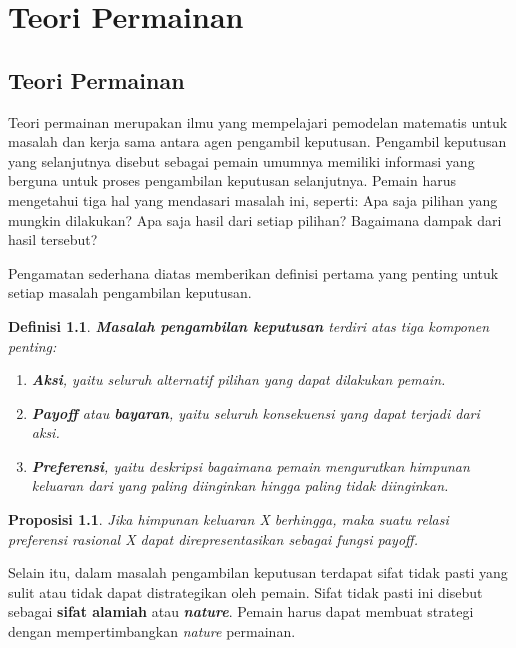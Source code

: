\newtheorem{definisi}{Definisi}
\newtheorem{proposisi}{Proposisi}
\newtheorem{aksioma}{Aksioma}
\chapter{Teori Permainan}
\section{Teori Permainan}
Teori permainan merupakan ilmu yang mempelajari pemodelan matematis untuk masalah dan kerja sama antara agen pengambil keputusan. Pengambil keputusan yang selanjutnya disebut sebagai pemain umumnya memiliki informasi yang berguna untuk proses pengambilan keputusan selanjutnya. Pemain harus mengetahui tiga hal yang mendasari masalah ini, seperti: Apa saja pilihan yang mungkin dilakukan? Apa saja hasil dari setiap pilihan? Bagaimana dampak dari hasil tersebut?

Pengamatan sederhana diatas memberikan definisi pertama yang penting untuk setiap masalah pengambilan keputusan.
\begin{definisi}
    \textbf{Masalah pengambilan keputusan} terdiri atas tiga komponen penting:
    \begin{enumerate}
        \item \textbf{Aksi}, yaitu seluruh alternatif pilihan yang dapat dilakukan pemain.
        \item \textbf{Payoff} atau \textbf{bayaran}, yaitu seluruh konsekuensi yang dapat terjadi dari aksi.
        \item \textbf{Preferensi}, yaitu deskripsi bagaimana pemain mengurutkan himpunan keluaran dari yang paling diinginkan hingga paling tidak diinginkan.
    \end{enumerate}
\end{definisi}

\begin{proposisi}
    Jika himpunan keluaran X berhingga, maka suatu relasi preferensi rasional X dapat direpresentasikan sebagai fungsi payoff.
\end{proposisi}

\pagebreak

Selain itu, dalam masalah pengambilan keputusan terdapat sifat tidak pasti yang sulit atau tidak dapat distrategikan oleh pemain. Sifat tidak pasti ini disebut sebagai \textbf{sifat alamiah} atau \textbf{\textit{nature}}. Pemain harus dapat membuat strategi dengan mempertimbangkan \textit{nature} permainan.

